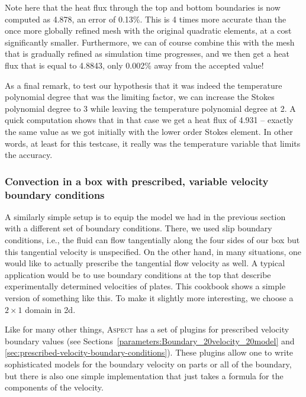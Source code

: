 \documentclass{article}
\newcommand{\aspect}{\textsc{Aspect}}
\begin{document}
Note here that the heat flux through the top and bottom boundaries is now
computed as 4.878, an error of 0.13\%. This is 4 times more accurate than the
once more globally refined mesh with the original quadratic elements, at a cost
significantly smaller. Furthermore, we can of course combine this with the mesh
that is gradually refined as simulation time progresses, and we then get a heat
flux that is equal to 4.8843, only 0.002\% away from the accepted value!

As a final remark, to test our hypothesis that it was indeed the temperature
polynomial degree that was the limiting factor, we can increase the Stokes
polynomial degree to 3 while leaving the temperature polynomial degree at 2. A
quick computation shows that in that case we get a heat flux of 4.931 -- exactly
the same value as we got initially with the lower order Stokes element. In other
words, at least for this testcase, it really was the temperature variable that
limits the accuracy.


\subsubsection{Convection in a box with prescribed, variable velocity boundary conditions}

A similarly simple setup is to equip the model we had in the previous section
with a different set of boundary conditions. There, we used slip boundary
conditions, i.e., the fluid can flow tangentially along the four sides of our
box but this tangential velocity is unspecified. On the other hand, in many
situations, one would like to actually prescribe the tangential flow velocity as
well. A typical application would be to use boundary conditions at the top that
describe experimentally determined velocities of plates. This cookbook shows a
simple version of something like this. To make it slightly more interesting, we
choose a $2\times 1$ domain in 2d.

Like for many other things, \aspect{} has a set of plugins for prescribed
velocity boundary values (see
Sections~\ref{parameters:Boundary_20velocity_20model} and
\ref{sec:prescribed-velocity-boundary-conditions}). These plugins allow one to
write sophisticated models for the boundary velocity on parts or all of the
boundary, but there is also one simple implementation that just takes a formula
for the components of the velocity.
\end{document}
